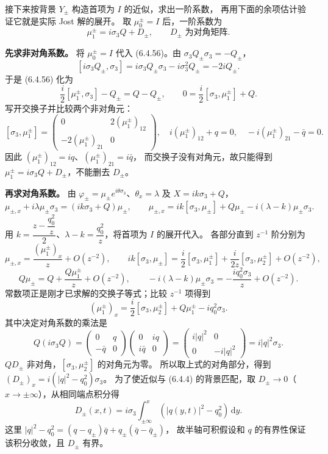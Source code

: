 \documentclass[lang=cn,scheme=chinese,mode=simple,device=normal,color=blue,
math=cm,thmcnt=section,12pt]{elegantbook}
\newcommand{\dd}{\,\mathrm{d}}
\newcommand{\eqq}[2]{\tag{#1}\label{eq:#1}#2}
\begin{document}
接下来按背景 $Y_\pm$ 构造首项为 $I$ 的近似，求出一阶系数，
再用下面的余项估计验证它就是实际 Jost 解的展开。
取 $\mu_0^\pm=I$ 后，一阶系数为
\begin{equation}\eqq{6.4.57}{\mu_1^\pm=i\sigma_3Q+D_\pm,\qquad D_\pm\text{ 为对角矩阵}.}\end{equation}

\begin{callout}
    \textbf{先求非对角系数。}
    将 $\mu_0^\pm=I$ 代入 (6.4.56)。由 $\sigma_3Q_\pm\sigma_3=-Q_\pm$，
    \[
        [i\sigma_3Q_\pm,\sigma_3]
        =i\sigma_3Q_\pm\sigma_3-i\sigma_3^2Q_\pm=-2iQ_\pm.
    \]
    于是 (6.4.56) 化为
    \[
        \dfrac{i}{2}[\mu_1^\pm,\sigma_3]-Q_\pm=Q-Q_\pm,
        \qquad 0=\dfrac{i}{2}[\sigma_3,\mu_1^\pm]+Q.
    \]
    写开交换子并比较两个非对角元：
    \[
        [\sigma_3,\mu_1^\pm]
        =\begin{pmatrix}0&2(\mu_1^\pm)_{12}\\-2(\mu_1^\pm)_{21}&0\end{pmatrix},
        \quad i(\mu_1^\pm)_{12}+q=0,\quad -i(\mu_1^\pm)_{21}-\bar q=0.
    \]
    因此 $(\mu_1^\pm)_{12}=iq$、$(\mu_1^\pm)_{21}=i\bar q$，
    而交换子没有对角元，故只能得到 $\mu_1^\pm=i\sigma_3Q+D_\pm$，不能删去 $D_\pm$。

    \textbf{再求对角系数。}
    由 $\varphi_\pm=\mu_\pm e^{i\theta\sigma_3}$、$\theta_x=\lambda$ 及 $X=ik\sigma_3+Q$，
    \[
        \mu_{\pm,x}+i\lambda\mu_\pm\sigma_3=(ik\sigma_3+Q)\mu_\pm,
        \qquad
        \mu_{\pm,x}=ik[\sigma_3,\mu_\pm]+Q\mu_\pm-i(\lambda-k)\mu_\pm\sigma_3.
    \]
    用 $k=\dfrac{z-\dfrac{q_0^2}{z}}{2}$、$\lambda-k=\dfrac{q_0^2}{z}$，将首项为 $I$ 的展开代入。
    各部分直到 $z^{-1}$ 阶分别为
    \[
        \mu_{\pm,x}=\dfrac{(\mu_1^\pm)_x}{z}+O(z^{-2}),\qquad
        ik[\sigma_3,\mu_\pm]=\dfrac{i}{2}[\sigma_3,\mu_1^\pm]
        +\dfrac{i}{2z}[\sigma_3,\mu_2^\pm]+O(z^{-2}),
    \]
    \[
        Q\mu_\pm=Q+\dfrac{Q\mu_1^\pm}{z}+O(z^{-2}),\qquad
        -i(\lambda-k)\mu_\pm\sigma_3=-\dfrac{iq_0^2\sigma_3}{z}+O(z^{-2}).
    \]
    常数项正是刚才已求解的交换子等式；比较 $z^{-1}$ 项得到
    \[
        (\mu_1^\pm)_x=\dfrac{i}{2}[\sigma_3,\mu_2^\pm]+Q\mu_1^\pm-iq_0^2\sigma_3.
    \]
    其中决定对角系数的乘法是
    \[
        Q(i\sigma_3Q)=\begin{pmatrix}0&q\\-\bar q&0\end{pmatrix}
        \begin{pmatrix}0&iq\\i\bar q&0\end{pmatrix}
        =\begin{pmatrix}i|q|^2&0\\0&-i|q|^2\end{pmatrix}=i|q|^2\sigma_3.
    \]
    $QD_\pm$ 非对角，$[\sigma_3,\mu_2^\pm]$ 的对角元为零。
    所以取上式的对角部分，得到 $(D_\pm)_x=i(|q|^2-q_0^2)\sigma_3$。
    为了使近似与 (6.4.4) 的背景匹配，取 $D_\pm\to0$（$x\to\pm\infty$），从相同端点积分得
    \[
        D_\pm(x,t)=i\sigma_3\int_{\pm\infty}^x(|q(y,t)|^2-q_0^2)\dd y.
    \]
    这里 $|q|^2-q_0^2=(q-q_\pm)\bar q+q_\pm(\bar q-\bar q_\pm)$，
    故半轴可积假设和 $q$ 的有界性保证该积分收敛，且 $D_\pm$ 有界。


\end{callout}
\end{document}
